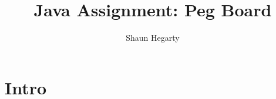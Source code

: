 \documentclass{beamer}
\begin{document}
\newcommand{\tab}{\hspace*{0.4in}} %
\newcommand{\spc}{\hspace{5pt}} %
\newcommand{\vspc}{\vspace*{0.23in}\\} %

\newcommand{\bd}{\textbf} %
\newcommand{\ita}{\textit} %
\newcommand{\ti}{\bf \LARGE} %
\newcommand{\blt}{\begin{itemize}} %
\newcommand{\finblt}{\end{itemize}} %
\newcommand{\eq}{\begin{equation}\label} %
\newcommand{\eqf}{\end{equation}}

\newcommand{\pic}[4]{
		\begin{figure}
		\texttt{[image: \#4]} 			
		\end{figure}}
		
\title{Java Assignment: Peg Board}
\author{Shaun Hegarty}





\section{Intro}

		\frame{\titlepage}
\end{document}
